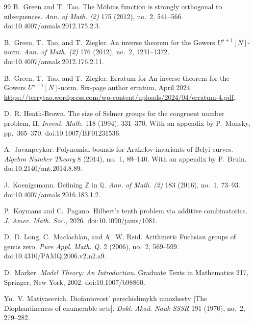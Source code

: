 \documentclass[11pt]{article}
\theoremstyle{definition}
\begin{document}
\begin{thebibliography}{99}
B.~Green and T.~Tao.
\newblock The M\"obius function is strongly orthogonal to nilsequences.
\newblock \emph{Ann. of Math. (2)} 175 (2012), no.~2, 541--566.
\newblock doi:10.4007/annals.2012.175.2.3.

B.~Green, T.~Tao, and T.~Ziegler.
\newblock An inverse theorem for the Gowers $U^{s+1}[N]$-norm.
\newblock \emph{Ann. of Math. (2)} 176 (2012), no.~2, 1231--1372.
\newblock doi:10.4007/annals.2012.176.2.11.

B.~Green, T.~Tao, and T.~Ziegler.
\newblock Erratum for An inverse theorem for the Gowers $U^{s+1}[N]$-norm.
\newblock Six-page author erratum, April 2024.
\newblock \url{https://terrytao.wordpress.com/wp-content/uploads/2024/04/erratum-4.pdf}.

D.~R. Heath-Brown.
\newblock The size of Selmer groups for the congruent number problem, II.
\newblock \emph{Invent. Math.} 118 (1994), 331--370.
\newblock With an appendix by P.~Monsky, pp.~365--370.
\newblock doi:10.1007/BF01231536.

A.~Javanpeykar.
\newblock Polynomial bounds for Arakelov invariants of Belyi curves.
\newblock \emph{Algebra Number Theory} 8 (2014), no.~1, 89--140.
\newblock With an appendix by P.~Bruin.  doi:10.2140/ant.2014.8.89.

J.~Koenigsmann.
\newblock Defining $\mathbb Z$ in $\mathbb Q$.
\newblock \emph{Ann. of Math. (2)} 183 (2016), no.~1, 73--93.
\newblock doi:10.4007/annals.2016.183.1.2.

P.~Koymans and C.~Pagano.
\newblock Hilbert's tenth problem via additive combinatorics.
\newblock \emph{J. Amer. Math. Soc.}, 2026.
\newblock doi:10.1090/jams/1081.

D.~D. Long, C.~Maclachlan, and A.~W. Reid.
\newblock Arithmetic Fuchsian groups of genus zero.
\newblock \emph{Pure Appl. Math. Q.} 2 (2006), no.~2, 569--599.
\newblock doi:10.4310/PAMQ.2006.v2.n2.a9.

D.~Marker.
\newblock \emph{Model Theory: An Introduction}.
\newblock Graduate Texts in Mathematics 217, Springer, New York, 2002.
\newblock doi:10.1007/b98860.

Yu.~V. Matiyasevich.
\newblock Diofantovost' perechislimykh mnozhestv [The Diophantineness of
  enumerable sets].
\newblock \emph{Dokl. Akad. Nauk SSSR} 191 (1970), no.~2, 279--282.


\end{thebibliography}
\end{document}
